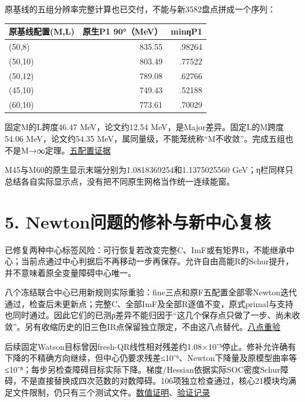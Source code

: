 \documentclass[
  10pt,
  a4paper,
]{article}
\newcounter{none} %
\begin{document}
原基线的五组分辨率完整计算也已交付，不能与新3582盘点拼成一个序列：

{\def\LTcaptype{none} %
\begin{longtable}[]{@{}lrr@{}}
\toprule\noalign{}
原基线配置(M,L) & 原生P1 90°（MeV） & minηP1 \\
\midrule\noalign{}
\endhead
\bottomrule\noalign{}
\endlastfoot
(50,8) & 835.55 & .98264 \\
(50,10) & 803.49 & .77522 \\
(50,12) & 789.08 & .62766 \\
(45,10) & 749.43 & .52188 \\
(60,10) & 773.61 & .70029 \\
\end{longtable}
}

固定M的L跨度46.47 MeV，论文约12.54 MeV，是Major差异。固定L的M跨度54.06
MeV，论文约54.35
MeV，属同量级，不能笼统称``M不收敛''。完成五组也不是M→∞定理。\href{../../sequential_reproduction_20260910/F_five_configs_verified_comparison/resolution.json}{五配置证据}

M45与M60的原生显示末端分别为1.0818369254和1.1375025560
GeV；η栏同样只总结各自实际显示点，没有把不同原生网格当作统一连续能窗。

\section{5.
Newton问题的修补与新中心复核}\label{newtonux95eeux9898ux7684ux4feeux8865ux4e0eux65b0ux4e2dux5fc3ux590dux6838}

已修复两种中心标签风险：可行恢复若改变完整C、ImF或有矩界R，不能继承中心；当前点通过中心判据后不再移动一步再保存。允许自由高能R的Schur提升，并不意味着原全变量障碍中心唯一。

八个冻结联合中心已用新规则实际重验：fine三点和原F五配置全部零Newton迭代通过，检查后未更新点；完整C、全部ImF及全部R逐值不变，原式primal与支持也同时通过。因此它们的已测ρ差异不能归因于``这几个保存点只做了一步、尚未收敛''。另有收缩历史的旧三色IR点保留独立限定，不由这八点替代。\href{../CENTER_RECHECK_RESULTS.md}{八点重验}

后续固定Watson目标曾因fresh-QR线性相对残差约1.08×10⁻⁵停止。修补允许确有下降的不精确方向继续，但中心仍要求残差≤10⁻⁶、Newton下降量及原模型曲率等≤10⁻⁸；每步另检查障碍目标实际下降。梯度/Hessian依据实际SOC密度Schur障碍，不是直接替换成四次范数的对数障碍。106项独立检查通过，核心21模块均满足文件限制，仍只有三个测试文件。\href{../../../evidence/INEXACT_NEWTON_AND_SAVED_CENTER_20260911.md}{数值证明}、\href{../verification_checked_point_descent.json}{验证记录}
\end{document}
